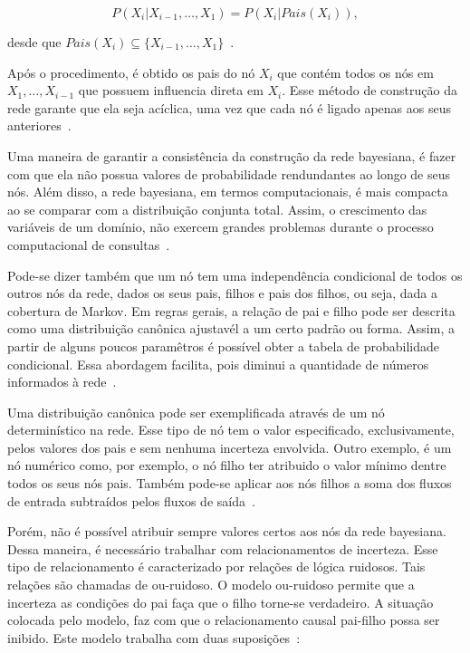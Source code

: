 \begin{equation}
    \label{eq:regra-cadeia}
    P(X_i|X_{i-1},\dots,X_1) = P(X_i|Pais(X_i)),
\end{equation}

desde que $Pais(X_i) \subseteq \{X_{i-1},\dots,X_1\}$~\cite{russell:2002}.

Após o procedimento, é obtido os pais do nó $X_i$ que contém todos os nós em $X_1, \dots, X_{i-1}$ que possuem influencia direta em $X_i$. Esse método de construção da rede garante que ela seja acíclica, uma vez que cada nó é ligado apenas aos seus anteriores~\cite{russell:2002}.

Uma maneira de garantir a consistência da construção da rede bayesiana, é fazer com que ela não possua valores de probabilidade rendundantes ao longo de seus nós. Além disso, a rede bayesiana, em termos computacionais, é mais compacta ao se comparar com a distribuição conjunta total. Assim, o crescimento das variáveis de um domínio, não exercem grandes problemas durante o processo computacional de consultas~\cite{russell:2002, faceli:2011}.

Pode-se dizer também que um nó tem uma independência condicional de todos os outros nós da rede, dados os seus pais, filhos e pais dos filhos, ou seja, dada a cobertura de Markov. Em regras gerais, a relação de pai e filho pode ser descrita como uma distribuição canônica ajustavél a um certo padrão ou forma. Assim, a partir de alguns poucos paramêtros é possível obter a tabela de probabilidade condicional. Essa abordagem facilita, pois diminui a quantidade de números informados à rede~\cite{russell:2002}.

Uma distribuição canônica pode ser exemplificada através de um nó determinístico na rede. Esse tipo de nó tem o valor especificado, exclusivamente, pelos valores dos pais e sem nenhuma incerteza envolvida. Outro exemplo, é um nó numérico como, por exemplo, o nó filho ter atribuido o valor mínimo dentre todos os seus nós pais. Também pode-se aplicar aos nós filhos a soma dos fluxos de entrada subtraídos pelos fluxos de saída~\cite{russell:2002}.

Porém, não é possível atribuir sempre valores certos aos nós da rede bayesiana. Dessa maneira, é necessário trabalhar com relacionamentos de incerteza. Esse tipo de relacionamento é caracterizado por relações de lógica ruidosos. Tais relações são chamadas de ou-ruidoso. O modelo ou-ruidoso permite que a incerteza as condições do pai faça que o filho torne-se verdadeiro. A situação colocada pelo modelo, faz com que o relacionamento causal pai-filho possa ser inibido. Este modelo trabalha com duas suposições~\cite{russell:2002}:

